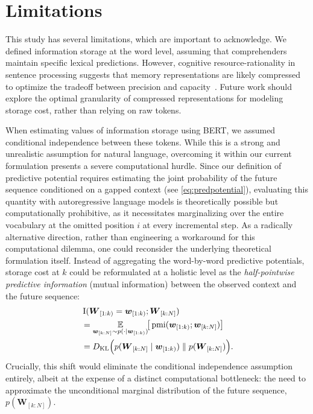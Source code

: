 \documentclass[11pt]{article}
\newcommand{\wseq}[2]{\ensuremath{\boldsymbol w_{[#1: #2]}}\xspace}
\newcommand{\Wseq}[2]{\ensuremath{\boldsymbol W_{[#1: #2]}}\xspace}
\newcommand{\curid}{\ensuremath{k}\xspace}
\newcommand{\sstartid}{\ensuremath{1}\xspace}
\newcommand{\sendid}{\ensuremath{N}\xspace}
\newcommand{\targetid}{\ensuremath{i}\xspace}
\newcommand{\context}{\ensuremath{\boldsymbol w_{[\sstartid:\curid)}}\xspace}
\newcommand{\Context}{\ensuremath{\boldsymbol W_{[\sstartid:\curid)}}\xspace}
\newcommand{\future}{\ensuremath{\wseq{\curid}{\sendid}}\xspace}
\newcommand{\Future}{\ensuremath{\Wseq{\curid}{\sendid}}\xspace}
\newcommand{\pmi}{\ensuremath{\operatorname{pmi}}\xspace}
\newcommand{\prob}[1]{\ensuremath{p(#1)}\xspace}
\newcommand{\condprob}[2]{\ensuremath{p(#1\mid #2)}\xspace}
\newcommand{\mi}[2]{\ensuremath{\operatorname{I}(#1;#2)}\xspace}
\newcommand{\condE}[3]{\ensuremath{\underset{#1\sim\condprob{\cdot}{#2}}{\mathbb{E}}\!\big[#3\big]}\xspace}
\newcommand{\KL}[2]{\ensuremath{D_{\operatorname{KL}}\Big(#1\parallel #2\Big)}\xspace}
\begin{document}
\section{Limitations}\label{sec:limitation}
This study has several limitations, which are important to acknowledge.
We defined information storage at the word level, assuming that comprehenders maintain specific lexical predictions.
However, cognitive resource-rationality in sentence processing suggests that memory representations are likely compressed to optimize the tradeoff between precision and capacity~\citep{hahn-etal-2022-resource,xu-futrell-2026}.
Future work should explore the optimal granularity of compressed representations for modeling storage cost, rather than relying on raw tokens.

When estimating values of information storage using BERT, we assumed conditional independence between these tokens.
While this is a strong and unrealistic assumption for natural language, overcoming it within our current formulation presents a severe computational hurdle.
Since our definition of predictive potential requires estimating the joint probability of the future sequence conditioned on a gapped context (see \cref{eq:predpotential}), evaluating this quantity with autoregressive language models is theoretically possible but computationally prohibitive, as it necessitates marginalizing over the entire vocabulary at the omitted position \targetid at every incremental step.
As a radically alternative direction, rather than engineering a workaround for this computational dilemma, one could reconsider the underlying theoretical formulation itself.
Instead of aggregating the word-by-word predictive potentials, storage cost at $\curid$ could be reformulated at a holistic level as the \emph{half-pointwise predictive information} (mutual information) between the observed context and the future sequence:
\begin{align}
    &\mi{\Context=\context}{\Future} \notag \\
    &= \condE{\future}{\context}{\pmi(\context; \future)} \notag \\
    &= \KL{\condprob{\Future}{\context}}{\prob{\Future}}.
\end{align}
Crucially, this shift would eliminate the conditional independence assumption entirely, albeit at the expense of a distinct computational bottleneck: the need to approximate the unconditional marginal distribution of the future sequence, \prob{\Future}.
\end{document}
